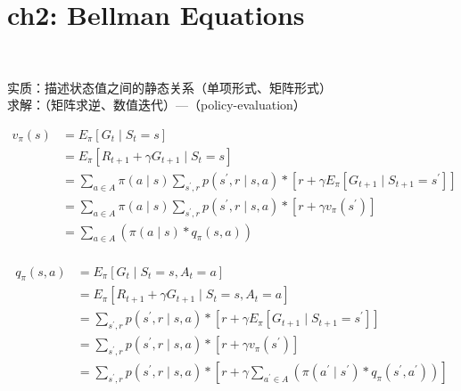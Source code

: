\documentclass{article}
\begin{document}
\newpage
\section*{ch2: Bellman Equations}


~ \\[3pt]
\begin{CJK}{UTF8}{gbsn}
    实质：描述状态值之间的静态关系（单项形式、矩阵形式） \\[3pt]
    求解：（矩阵求逆、数值迭代）---（policy-evaluation）\\[3pt]
\end{CJK}


\begin{align*}
    v_{\pi}(s)
      &= E_{\pi} \left[ G_{t} \mid S_{t}=s \right] \\[3pt]
      &= E_{\pi} \left[ R_{t+1}+\gamma G_{t+1} \mid S_{t}=s \right] \\[3pt]
      &= \sum_{a \in A} \pi(a \mid s) 
         \sum_{s^{\prime}, r} 
         p \left( s^{\prime}, r \mid s, a \right) * 
         \left[ r + \gamma E_{\pi} 
         \left[ G_{t+1} \mid S_{t+1}=s^{\prime} \right] \right] \\[3pt]
      &= \sum_{a \in A} \pi(a \mid s) 
         \sum_{s^{\prime}, r} 
         p \left( s^{\prime}, r \mid s, a \right) * 
         \left[ r + \gamma 
         v_{\pi} \left( s^{\prime} \right) \right] \\[3pt]
      &= \sum_{a \in A} 
         \left( \pi(a \mid s) * q_{\pi}(s, a) \right) \\[3pt]
\end{align*}

\begin{align*}
    q_{\pi}(s, a)
      &= E_{\pi} \left[ G_{t} \mid S_{t}=s, A_{t}=a \right] \\[3pt]
      &= E_{\pi} \left[ R_{t+1}+\gamma G_{t+1} 
         \mid S_{t}=s, A_{t}=a \right] \\[3pt]
      &= \sum_{s^{\prime}, r} 
         p \left( s^{\prime}, r \mid s, a \right) * 
         \left[ r + \gamma E_{\pi} 
         \left[ G_{t+1} \mid S_{t+1}=s^{\prime} \right] \right] \\[3pt]
      &= \sum_{s^{\prime}, r} 
         p \left( s^{\prime}, r \mid s, a \right) * 
         \left[ r + \gamma 
         v_{\pi} \left( s^{\prime} \right) \right] \\[3pt]
      &= \sum_{s^{\prime}, r} 
         p \left( s^{\prime}, r \mid s, a \right) * 
         \left[ r + \gamma 
         \sum_{a^{\prime} \in A} 
         \left( \pi \left( a^{\prime} \mid s^{\prime} \right) * 
         q_{\pi} \left( s^{\prime}, a^{\prime} \right) 
         \right) \right] \\[3pt]
\end{align*}
\end{document}
